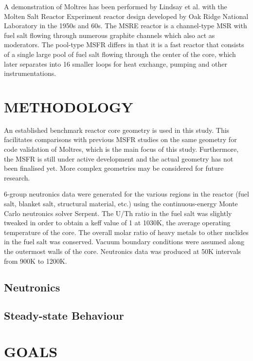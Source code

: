 \documentclass[letterpaper]{mandc2019}
\begin{document}
A demonstration of Moltres has been performed by Lindsay et al. \cite{lindsay_introduction_2018} with the Molten Salt Reactor Experiment reactor design developed by Oak Ridge National Laboratory in the 1950s and 60s. The MSRE reactor is a channel-type MSR with fuel salt flowing through numerous graphite channels which also act as moderators. The pool-type MSFR differs in that it is a fast reactor that consists of a single large pool of fuel salt flowing through the center of the core, which later separates into 16 smaller loops for heat exchange, pumping and other instrumentations. 

\section{METHODOLOGY}

An established benchmark reactor core geometry is used in this study. This facilitates comparisons with previous MSFR studies on the same geometry for code validation of Moltres, which is the main focus of this study. Furthermore, the MSFR is still under active development and the actual geometry has not been finalised yet. More complex geometries may be considered for future research.

6-group neutronics data were generated for the various regions in the reactor (fuel salt, blanket salt, structural material, etc.) using the continuous-energy Monte Carlo neutronics solver Serpent. The U/Th ratio in the fuel salt was slightly tweaked in order to obtain a keff value of 1 at 1030K, the average operating temperature of the core. The overall molar ratio of heavy metals to other nuclides in the fuel salt was conserved. Vacuum boundary conditions were assumed along the outermost walls of the core. Neutronics data was produced at 50K intervals from 900K to 1200K.

\subsection{Neutronics}

\subsection{Steady-state Behaviour}

\section{GOALS}

\setlength{\baselineskip}{12pt}


\end{document}
